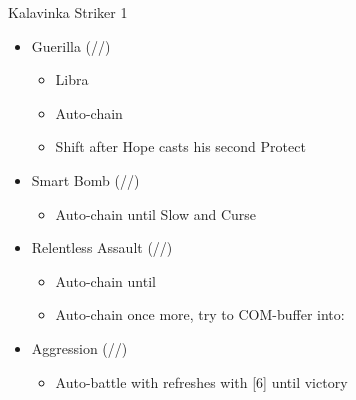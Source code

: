 \renewcommand{\first}{[1] Guerilla (\rav/\syn/\sab)}
\renewcommand{\second}{[2] Smart Bomb (\rav/\rav/\sab)}
\renewcommand{\third}{[3] Mystic Tower}
\renewcommand{\fourth}{[4] Relentless Assault (\rav/\rav/\com)}
\renewcommand{\fifth}{[5] Aggression (\com/\rav/\com)}
\begin{battle}{Kalavinka Striker 1}
\begin{itemize}
    \item \first
    \begin{itemize}
        \item Libra
        \item Auto-chain
        \item Shift after Hope casts his second Protect
    \end{itemize}
    \item \second
    \begin{itemize}
        \item Auto-chain until Slow and Curse
    \end{itemize}
    \item \fourth
    \begin{itemize}
        \item Auto-chain until \stagger
        \item Auto-chain once more, try to COM-buffer into:
    \end{itemize}
    \item \fifth
    \begin{itemize}
        \item Auto-battle with refreshes with [6] until victory
    \end{itemize}
\end{itemize}
\end{battle}

